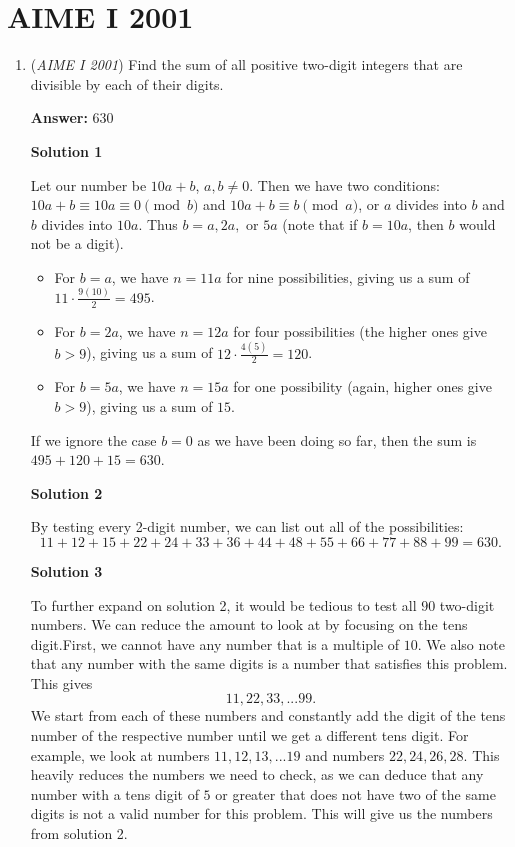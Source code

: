 \section{AIME I 2001}
        \begin{enumerate}
        	\item (\textit{AIME I 2001}) Find the sum of all positive two-digit integers that are divisible by each of their digits.


 
 \textbf{Answer: }630



\textbf{Solution 1}

Let our number be $10a + b$, $a,b \neq 0$. Then we have two conditions: $10a + b \equiv 10a \equiv 0 \pmod{b}$ and $10a + b \equiv b \pmod{a}$, or $a$ divides into $b$ and $b$ divides into $10a$. Thus $b = a, 2a,$ or $5a$ (note that if $b = 10a$, then $b$ would not be a digit).  

 
            \begin{itemize}
        \item For $b = a$, we have $n = 11a$ for nine possibilities, giving us a sum of $11 \cdot \frac {9(10)}{2} = 495$.
        \item For $b = 2a$, we have $n = 12a$ for four possibilities (the higher ones give $b > 9$), giving us a sum of $12 \cdot \frac {4(5)}{2} = 120$.
        \item For $b = 5a$, we have $n = 15a$ for one possibility (again, higher ones give $b > 9$), giving us a sum of $15$.
            \end{itemize}
            If we ignore the case $b = 0$ as we have been doing so far, then the sum is $495 + 120 + 15 = \boxed{630}$.

 



\textbf{Solution 2}

By testing every 2-digit number, we can list out all of the possibilities: 
 \[11+12+15+22+24+33+36+44+48+55+66+77+88+99=\boxed{630}.\]




\textbf{Solution 3}

To further expand on solution 2, it would be tedious to test all $90$ two-digit numbers. We can reduce the amount to look at by focusing on the tens digit.First, we cannot have any number that is a multiple of $10$. We also note that any number with the same digits is a number that satisfies this problem. This gives 
 \[11, 22, 33, ... 99.\] We start from each of these numbers and constantly add the digit of the tens number of the respective number until we get a different tens digit. For example, we look at numbers $11, 12, 13, ... 19$ and numbers $22, 24, 26, 28$. This heavily reduces the numbers we need to check, as we can deduce that any number with a tens digit of $5$ or greater that does not have two of the same digits is not a valid number for this problem. This will give us the numbers from solution 2.


\end{enumerate}
